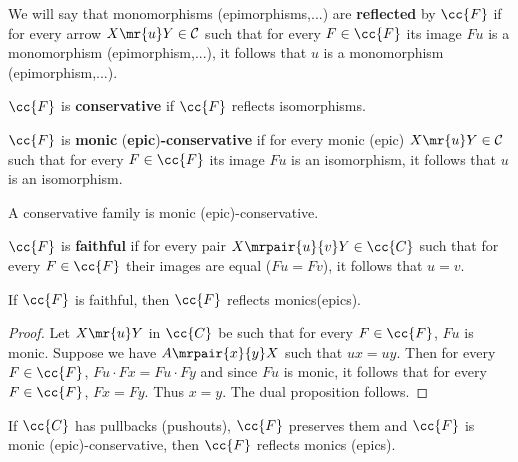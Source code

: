 \begin{definition}
We will say that monomorphisms (epimorphisms,...) are \textbf{reflected} by $\cc{F}$ if for every arrow ${X\mr{u}}Y \in \mathcal{C}$ such that for every $F \in \cc{F}$  its image $Fu$ is a monomorphism (epimorphism,...), it follows that $u$ is a monomorphism (epimorphism,...).
\end{definition}


\begin{definition}
$\cc{F}$ is \textbf{conservative} if $\cc{F}$ reflects isomorphisms.
\end{definition}

\begin{definition}
$\cc{F}$ is \textbf{monic} (\textbf{epic})\textbf{-conservative} if for every monic (epic) ${{X \mr{u} Y}  \in \mathcal{C}}$ such that for every $F \in \cc{F}$ its image $Fu$ is an isomorphism, it follows that $u$ is an isomorphism.  
 \end{definition}


\begin{observation}
A conservative family is monic (epic)-conservative. 
\end{observation}

\begin{definition}
$\cc{F}$ is \textbf{faithful} if for every pair ${X\mrpair{u}{v}Y} \in \cc{C}$ such that for every $ F\in \cc{F}$ their images are  equal ($Fu=Fv$), it follows that $u=v$.
 \end{definition}


\begin{lemma}\label{si fiel, refleja monos}
If $\cc{F}$ is faithful, then $\cc{F}$ reflects monics(epics). 
\end{lemma}

\begin{proof}
Let $X \mr{u} Y$ in $\cc{C}$ be such that for every $F\in\cc{F}$, $Fu$ is monic. Suppose we have $A \mrpair{x}{y} X$ such that $ux=uy $. Then for every $F\in\cc{F}$, $Fu \cdot Fx=Fu \cdot Fy$ and since $Fu$ is monic, it follows that for every $F\in\cc{F}$, $Fx=Fy$. Thus $x=y$. The dual proposition follows.
\end{proof}

\begin{lemma}\label{con pullback reflejo monos}
If $\cc{C}$ has pullbacks (pushouts), $\cc{F}$ preserves them and $\cc{F}$ is monic (epic)-conservative, then $\cc{F}$ reflects monics (epics). 
\end{lemma}


